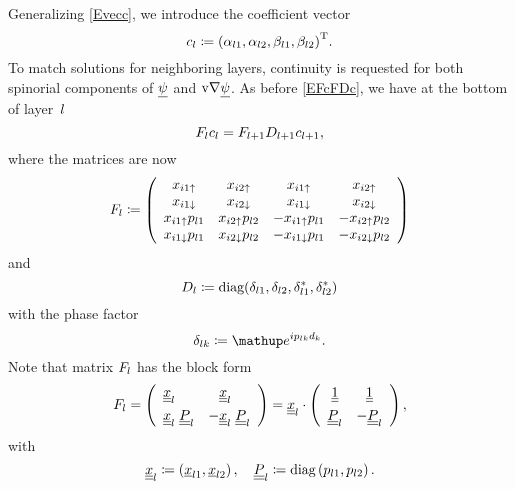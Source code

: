 Generalizing \cref{Evecc},
we introduce the coefficient vector
\begin{equation}
  c_l \coloneqq  {(\alpha_{l1}, \alpha_{l2}, \beta_{l1}, \beta_{l2})}^\text{T}.
\end{equation}
To match solutions for neighboring layers,
continuity is requested for both spinorial components
of $\underline{\psi}$ and $\text{v}{\nabla}\underline{\psi}$.
As before \cref{EFcFDc}, we have at the bottom of layer~$l$
\begin{equation}\label{EFcFDcp}
  F_l c_l = F_{l+1} D_{l+1} c_{l+1},
\end{equation}
where the matrices are now
\begin{equation}
  F_l \coloneqq  \left(\begin{array}{cccc}
    x_{i1\uparrow}      &x_{i2\uparrow}     &x_{i1\uparrow}       &x_{i2\uparrow}       \\
    x_{i1\downarrow}      &x_{i2\downarrow}     &x_{i1\downarrow}       &x_{i2\downarrow}       \\
    x_{i1\uparrow}p_{l1}&x_{i2\uparrow}p_{l2}&-x_{i1\uparrow}p_{l1}&-x_{i2\uparrow}p_{l2}\\
    x_{i1\downarrow}p_{l1}&x_{i2\downarrow}p_{l2}&-x_{i1\downarrow}p_{l1}&-x_{i2\downarrow}p_{l2}
  \end{array}\right)
\end{equation}
and
\begin{equation}
  D_l \coloneqq  \text{diag}(\delta_{l1}, \delta_{l2}, \delta_{l1}^*, \delta_{l2}^*)
\end{equation}
with the phase factor
\begin{equation}
   \delta_{\il k} \coloneqq  \e^{ip_{\il k}d_k}.
\end{equation}
Note that matrix $F_l$ has the block form
\begin{equation}
  F_l
  =\left(\begin{array}{ll}\underline{\underline{x}}_l&\hphantom{-}\underline{\underline{x}}_l\\[1ex]
    \underline{\underline{x}}_l\; \underline{\underline{P}}_l&-\underline{\underline{x}}_l\; \underline{\underline{P}}_l\end{array}\right)
    = \underline{\underline{x}}_l \cdot
    \left(\begin{array}{cc}\underline{\underline{1}}&\underline{\underline{1}}\\[1ex]
    \underline{\underline{P}}_l&-\underline{\underline{P}}_l\end{array}\right),
\end{equation}
with
\begin{equation}
  \underline{\underline{x}}_l \coloneqq
  \left(\underline{x}_{l1}, \underline{x}_{l2}\right),
  \quad
  \underline{\underline{P}}_l \coloneqq
  \text{diag}\left(p_{l1},p_{l2}\right).
\end{equation}
